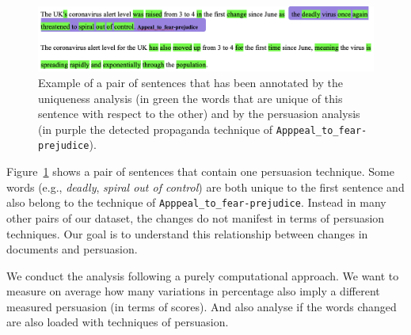\begin{figure}[!htbp]
    \centering
    \includegraphics[width=\linewidth]{figures/annotation_212_annotated.png}
    \caption{Example of a pair of sentences that has been annotated by the uniqueness analysis (in green the words that are unique of this sentence with respect to the other) and by the persuasion analysis (in purple the detected propaganda technique of \texttt{Apppeal\_to\_fear-prejudice}).}
    \label{fig:annotated_clique_data}
\end{figure}

Figure~\ref{fig:annotated_clique_data} shows a pair of sentences that contain one persuasion technique. Some words (e.g., \emph{deadly}, \emph{spiral out of control}) are both unique to the first sentence and also belong to the technique of \texttt{Apppeal\_to\_fear-prejudice}. Instead in many other pairs of our dataset, the changes do not manifest in terms of persuasion techniques.
Our goal is to understand this relationship between changes in documents and persuasion.

We conduct the analysis following a purely computational approach.
%
We want to measure on average how many variations in percentage also imply a different measured persuasion (in terms of scores). %
And also analyse if the words changed are also loaded with techniques of persuasion.

